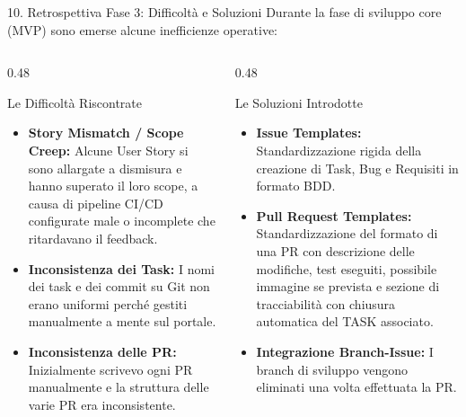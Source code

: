 \documentclass[aspectratio=169, 10pt]{beamer}
\begin{document}
\begin{frame}{10. Retrospettiva Fase 3: Difficoltà e Soluzioni}
  Durante la fase di sviluppo core (MVP) sono emerse alcune inefficienze operative:
  \vspace{0.3cm}
  \begin{columns}
    \begin{column}{0.48\textwidth}
      \begin{block}{Le Difficoltà Riscontrate}
        \begin{itemize}
          \item \textbf{Story Mismatch / Scope Creep:} Alcune User Story si sono allargate a dismisura e hanno superato il loro scope, a causa di pipeline CI/CD configurate male o incomplete che ritardavano il feedback.
          \item \textbf{Inconsistenza dei Task:} I nomi dei task e dei commit su Git non erano uniformi perché gestiti manualmente a mente sul portale.
          \item \textbf{Inconsistenza delle PR:} Inizialmente scrivevo ogni PR manualmente e la struttura delle varie PR era inconsistente.
        \end{itemize}
      \end{block}
    \end{column}
    \begin{column}{0.48\textwidth}
      \begin{block}{Le Soluzioni Introdotte}
        \begin{itemize}
          \item \textbf{Issue Templates:} Standardizzazione rigida della creazione di Task, Bug e Requisiti in formato BDD.
          \item \textbf{Pull Request Templates:} Standardizzazione del formato di una PR con descrizione delle modifiche, test eseguiti, possibile immagine se prevista e sezione di tracciabilità con chiusura automatica del TASK associato.
          \item \textbf{Integrazione Branch-Issue:} I branch di sviluppo vengono eliminati una volta effettuata la PR.
        \end{itemize}
      \end{block}
    \end{column}
  \end{columns}
\end{frame}
\end{document}
